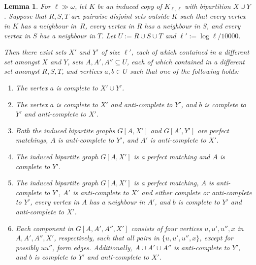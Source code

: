 \documentclass[11pt,english]{article}
\theoremstyle{plain}
\newtheorem{lem}[thm]{Lemma}
\theoremstyle{definition}
\theoremstyle{remark}
\begin{document}
    \begin{lem}\label{lem:cases}
        For $\ell \gg \omega$, let $K$ be an induced copy of $K_{\ell,\ell}$ with bipartition $X\cup Y$.
        Suppose that $R, S, T$ are pairwise disjoint sets outside $K$ such that every vertex in $K$ has a neighbour in~$R$, every vertex in $R$ has a neighbour in $S$, and every vertex in $S$ has a neighbour in $T$. 
        Let $U:=R\cup S\cup T$ and $\ell' := \log \ell / 10000$.
        
        
        Then there exist sets $X'$ and $Y'$ of size $\ell'$, each of which contained in a different set amongst $X$ and $Y$, sets $A, A', A'' \subseteq U$, each of which contained in a different set amongst $R, S, T$, and vertices $a, b \in U$ such that one of the following holds:
        \begin{enumerate} [label = (K\arabic*)]
            \item \label{itm:a}
                The vertex $a$ is complete to $X' \cup Y'$.
            \item \label{itm:b}
                The vertex $a$ is complete to $X'$ and anti-complete to $Y'$, and $b$ is complete to $Y'$ and anti-complete to $X'$. 
            \item \label{itm:c}
                Both the induced bipartite graphs $G[A, X']$ and $G[A', Y']$ are perfect matchings, $A$ is anti-complete to $Y'$, and $A'$ is anti-complete to $X'$.
                
            \item \label{itm:d}
                The induced bipartite graph $G[A, X']$ is a perfect matching and $A$ is complete to $Y'$.
            \item \label{itm:e}
                The induced bipartite graph $G[A, X']$ is a perfect matching, $A$ is anti-complete to $Y'$, $A'$ is anti-complete to $X'$ and either complete or anti-complete to $Y'$, every vertex in $A$ has a neighbour in $A'$, and $b$ is complete to $Y'$ and anti-complete to $X'$.
                
            \item \label{itm:f}
                Each component in $G[A, A', A'', X']$ consists of four vertices $u, u', u'', x$ in $A, A', A'', X'$, respectively, such that all pairs in $\{u, u', u'', x\}$, except for possibly $uu''$, form edges. Additionally, $A \cup A' \cup A''$ is anti-complete to $Y'$, and $b$ is complete to $Y'$ and anti-complete to $X'$.
                
        \end{enumerate}
    \end{lem}
    
\end{document}
